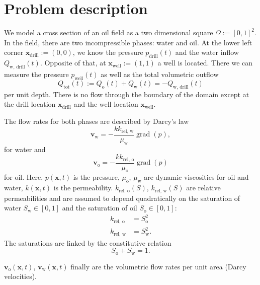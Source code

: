 \documentclass[twoside]{IEEEtran}
\DeclareMathOperator*{\grad}{grad}
\renewcommand*{\vec}[1]{\ensuremath{{\bm{#1}}}}
\begin{document}
\section{Problem description}
\label{problemDescription}
We model a cross section of an oil field as a two dimensional square $\Omega := [0, 1]^2.$ In the field, there are two incompressible phases: water and oil. 
At the lower left corner $\vec{x}_\text{drill} := (0, 0)$, we know the pressure $p_\text{drill}(t)$ and the water inflow $Q_\text{w, drill}(t).$ Opposite of that, at $\vec{x}_\text{well} := (1, 1)$ a well is located.
There we can measure the pressure $p_\text{well}(t)$ as well as the total volumetric outflow \begin{equation}
{Q}_\text{tot}(t) := {Q}_\text{o}(t) + {Q}_\text{w}(t) = -Q_\text{w, drill}(t)
\end{equation} per unit depth.
There is no flow through the boundary of the domain except at the drill location $\vec{x}_\text{drill}$ and the well location $\vec{x}_\text{well}.$

The flow rates for both phases are described by Darcy's law
\begin{equation}
\label{flowrateWater}
\vec{v}_\text{w} = -\frac{k k_\text{rel, w}}{\mu_\text{w}} \grad(p),
\end{equation}
for water and
\begin{equation}
\label{flowrateOil}
\vec{v}_\text{o} = -\frac{k k_\text{rel, o}}{\mu_\text{o}} \grad(p)
\end{equation}
for oil.
Here, $p(\vec{x}, t)$ is the pressure, $\mu_\text{o}$, $\mu_\text{w}$ are dynamic viscosities for oil and water, $k(\vec{x}, t)$ is the permeability.
$k_\text{rel, o}(S)$, $k_\text{rel, w}(S)$ are relative permeabilities and are assumed to depend quadratically on the saturation of water $S_\text{w} \in [0, 1]$ and the saturation of oil $S_\text{o} \in [0, 1]$:
\begin{align}
\label{relativePermeabilityModel}
k_\text{rel, o} &= S_\text{o}^2\\
k_\text{rel, w} &= S_\text{w}^2.
\end{align}
The saturations are linked by the constitutive relation
\begin{equation}
S_\text{o} + S_\text{w} = 1.
\end{equation}

$\vec{v}_\text{o}(\vec{x}, t)$, $\vec{v}_\text{w}(\vec{x}, t)$ finally are the volumetric flow rates per unit area (Darcy velocities).
\end{document}
